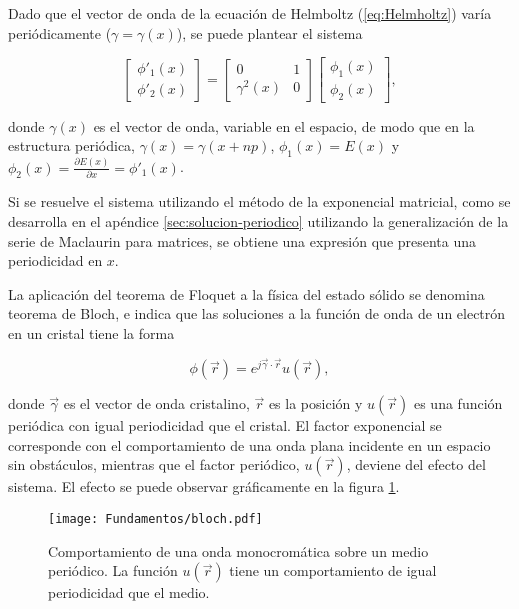 Dado que el vector de onda de la ecuación de Helmboltz (\ref{eq:Helmholtz}) varía periódicamente ($\gamma = \gamma(x)$), se puede plantear el sistema

\begin{equation}
	\begin{bmatrix}
		\phi'_1(x) \\
		\phi'_2(x)
	\end{bmatrix}
	=
	\begin{bmatrix}
		0 & 1 \\
		\gamma^2(x) & 0
	\end{bmatrix}
	\begin{bmatrix}
		\phi_1(x) \\
		\phi_2(x)
	\end{bmatrix},
\end{equation}

donde $\gamma(x)$ es el vector de onda, variable en el espacio, de modo que en la estructura periódica, $\gamma(x) = \gamma(x+n p)$, $\phi_1(x) = E(x)$ y $\phi_2(x) = \frac{\partial E(x)}{\partial x} = \phi'_1(x)$. 

Si se resuelve el sistema utilizando el método de la exponencial matricial, como se desarrolla en el apéndice \ref{sec:solucion-periodico} utilizando la generalización de la serie de Maclaurin para matrices, se obtiene una expresión que presenta una periodicidad en $x$.



La aplicación del teorema de Floquet a la física del estado sólido se denomina teorema de Bloch, e indica que las soluciones a la función de onda de un electrón en un cristal tiene la forma

\begin{equation}
\phi(\vec{r}) = e^{j\vec{\gamma} \cdot \vec{r}} u(\vec{r}),
\end{equation}

donde $\vec{\gamma}$ es el vector de onda cristalino, $\vec{r}$ es la posición y $u(\vec{r})$ es una función periódica con igual periodicidad que el cristal. El factor exponencial se corresponde con el comportamiento de una onda plana incidente en un espacio sin obstáculos, mientras que el factor periódico, $u(\vec{r})$, deviene del efecto del sistema. El efecto se puede observar gráficamente en la figura \ref{fig:bloch-periodico-1d}.

\begin{figure}[htp]
	\centering
	\texttt{[image: Fundamentos/bloch.pdf]}
	\caption{Comportamiento de una onda monocromática sobre un medio periódico. La función $u(\vec{r})$ tiene un comportamiento de igual periodicidad que el medio.}
	\label{fig:bloch-periodico-1d}
\end{figure}

